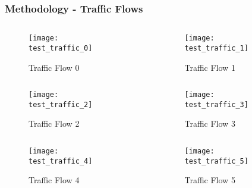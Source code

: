 \documentclass{beamer}
\begin{document}
\begin{frame}
	\frametitle{Methodology - Traffic Flows}
	
	\vspace{-15pt}

	\begin{overprint}
		\begin{columns}
		\begin{column}{.5\textwidth}
			\begin{figure}
			\caption{Traffic Flow 0}
			\texttt{[image: test\_traffic\_0]}
			\end{figure}
		\end{column}
		\begin{column}{.5\textwidth}
			\begin{figure}
			\caption{Traffic Flow 1}
			\texttt{[image: test\_traffic\_1]}
			\end{figure}
		\end{column}
		\end{columns}

	\onslide<2>
		\begin{columns}
		\begin{column}{.5\textwidth}
			\begin{figure}
			\caption{Traffic Flow 2}
			\texttt{[image: test\_traffic\_2]}
			\end{figure}
		\end{column}
		\begin{column}{.5\textwidth}
			\begin{figure}
			\caption{Traffic Flow 3}
			\texttt{[image: test\_traffic\_3]}
			\end{figure}
		\end{column}
		\end{columns}

	\onslide<3>
		\begin{columns}
		\begin{column}{.5\textwidth}
			\begin{figure}
			\caption{Traffic Flow 4}
			\texttt{[image: test\_traffic\_4]}
			\end{figure}
		\end{column}
		\begin{column}{.5\textwidth}
			\begin{figure}
			\caption{Traffic Flow 5}
			\texttt{[image: test\_traffic\_5]}
			\end{figure}
		\end{column}
		\end{columns}


\end{overprint}
\end{frame}
\end{document}
